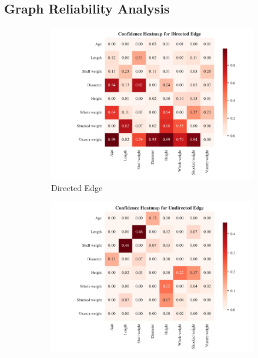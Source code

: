 \documentclass{article}
\begin{document}
\subsection{Graph Reliability Analysis}

\begin{figure}[H]
    \centering
    \begin{subfigure}{0.32\textwidth}
        \centering
        \includegraphics[width=\linewidth]{./demo_data/20241104_121546/Abalone/output_graph/certain_edges_confidence_heatmap.jpg}
        \caption{Directed Edge}
    \end{subfigure}
    \begin{subfigure}{0.32\textwidth}
        \centering
        \includegraphics[width=\linewidth]{./demo_data/20241104_121546/Abalone/output_graph/uncertain_edges_confidence_heatmap.jpg}

\end{subfigure}
\end{figure}
\end{document}
